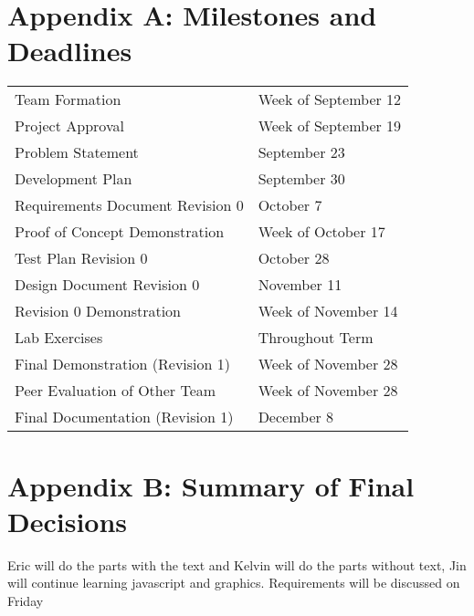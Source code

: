 \documentclass[11pt]{meetingmins}
\begin{document}
\newpage
\section{Appendix A: Milestones and Deadlines}
\begin{tabular}{ p{6.7cm} l}

  Team Formation & Week of September 12\\

  Project Approval & Week of September 19\\

  Problem Statement & September 23\\

  Development Plan & September 30\\

  Requirements Document Revision 0 & October 7\\

  Proof of Concept Demonstration & Week of October 17\\

  Test Plan Revision 0 & October 28\\

  Design Document Revision 0 & November 11\\

  Revision 0 Demonstration & Week of November 14\\

  Lab Exercises & Throughout Term\\

  Final Demonstration (Revision 1) & Week of November 28\\

  Peer Evaluation of Other Team & Week of November 28\\

  Final Documentation (Revision 1) & December 8\\

\end{tabular}

\newpage
\section{Appendix B: Summary of Final Decisions}
	Eric will do the parts with the text and Kelvin will do the parts without text, 
Jin will continue learning javascript and 		graphics. Requirements will be 
discussed on Friday
\end{document}

